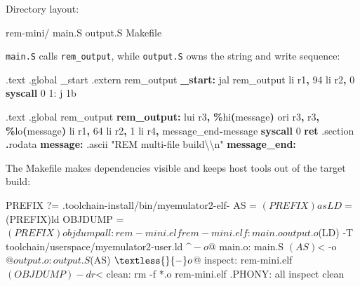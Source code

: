 \documentclass[
  oneside,
  openany]{book}
\newenvironment{Shaded}{\begin{snugshade}}{\end{snugshade}}
\newcommand{\BaseNTok}[1]{\textcolor[rgb]{0.00,0.00,0.81}{#1}}
\newcommand{\BuiltInTok}[1]{#1}
\newcommand{\ControlFlowTok}[1]{\textcolor[rgb]{0.13,0.29,0.53}{\textbf{#1}}}
\newcommand{\DecValTok}[1]{\textcolor[rgb]{0.00,0.00,0.81}{#1}}
\newcommand{\FunctionTok}[1]{\textcolor[rgb]{0.13,0.29,0.53}{\textbf{#1}}}
\newcommand{\NormalTok}[1]{#1}
\newcommand{\OperatorTok}[1]{\textcolor[rgb]{0.81,0.36,0.00}{\textbf{#1}}}
\newcommand{\StringTok}[1]{\textcolor[rgb]{0.31,0.60,0.02}{#1}}
\begin{document}
Directory layout:

\begin{Shaded}
\begin{Highlighting}[]
\NormalTok{rem{-}mini/}
\NormalTok{  main.S}
\NormalTok{  output.S}
\NormalTok{  Makefile}
\end{Highlighting}
\end{Shaded}

\texttt{main.S} calls \texttt{rem\_output}, while \texttt{output.S} owns
the string and write sequence:

\begin{Shaded}
\begin{Highlighting}[]
\NormalTok{.text}
\NormalTok{.global \_start}
\NormalTok{.extern rem\_output}
\FunctionTok{\_start:}
\NormalTok{        jal rem\_output}
\NormalTok{        li  r1}\OperatorTok{,} \DecValTok{94}
\NormalTok{        li  r2}\OperatorTok{,} \DecValTok{0}
        \ControlFlowTok{syscall} \DecValTok{0}
\NormalTok{1:      j }\BaseNTok{1b}
\end{Highlighting}
\end{Shaded}

\begin{Shaded}
\begin{Highlighting}[]
\NormalTok{.text}
\NormalTok{.global rem\_output}
\FunctionTok{rem\_output:}
\NormalTok{        lui r3}\OperatorTok{,} \OperatorTok{\%}\NormalTok{hi}\OperatorTok{(}\NormalTok{message}\OperatorTok{)}
\NormalTok{        ori r3}\OperatorTok{,}\NormalTok{ r3}\OperatorTok{,} \OperatorTok{\%}\NormalTok{lo}\OperatorTok{(}\NormalTok{message}\OperatorTok{)}
\NormalTok{        li  r1}\OperatorTok{,} \DecValTok{64}
\NormalTok{        li  r2}\OperatorTok{,} \DecValTok{1}
\NormalTok{        li  r4}\OperatorTok{,}\NormalTok{ message\_end}\OperatorTok{{-}}\NormalTok{message}
        \ControlFlowTok{syscall} \DecValTok{0}
        \ControlFlowTok{ret}
\NormalTok{.}\BuiltInTok{section} \OperatorTok{.}\NormalTok{rodata}
\FunctionTok{message:}\NormalTok{ .ascii }\StringTok{"REM multi{-}file build\textbackslash{}\textbackslash{}n"}
\FunctionTok{message\_end:}
\end{Highlighting}
\end{Shaded}

The Makefile makes dependencies visible and keeps host tools out of the
target build:

\begin{Shaded}
\begin{Highlighting}[]
\NormalTok{PREFIX ?= .toolchain{-}install/bin/myemulator2{-}elf{-}}
\NormalTok{AS = $(PREFIX)as}
\NormalTok{LD = $(PREFIX)ld}
\NormalTok{OBJDUMP = $(PREFIX)objdump}

\NormalTok{all: rem{-}mini.elf}
\NormalTok{rem{-}mini.elf: main.o output.o}
\NormalTok{    $(LD) {-}T toolchain/userspace/myemulator2{-}user.ld $\^{} {-}o $@}
\NormalTok{main.o: main.S}
\NormalTok{    $(AS) $\textless{} {-}o $@}
\NormalTok{output.o: output.S}
\NormalTok{    $(AS) $\textless{} {-}o $@}
\NormalTok{inspect: rem{-}mini.elf}
\NormalTok{    $(OBJDUMP) {-}dr $\textless{}}
\NormalTok{clean:}
\NormalTok{    rm {-}f *.o rem{-}mini.elf}
\NormalTok{.PHONY: all inspect clean}
\end{Highlighting}
\end{Shaded}
\end{document}

